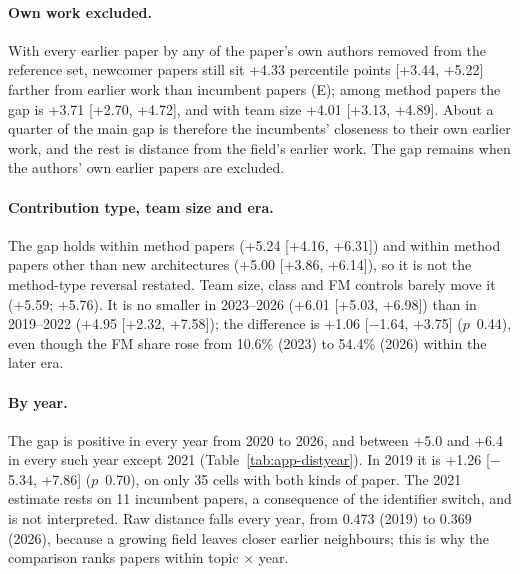 \paragraph{Own work excluded.} With every earlier paper by any of the paper's own authors removed from the reference
set, newcomer papers still sit +4.33 percentile points [+3.44, +5.22] farther from earlier work than incumbent papers
(E); among method papers the gap is +3.71 [+2.70, +4.72], and with team size +4.01 [+3.13, +4.89]. About a quarter of
the main gap is therefore the incumbents' closeness to their own earlier work, and the rest is distance from the
field's earlier work. The gap remains when the authors' own earlier papers are excluded.

\paragraph{Contribution type, team size and era.} The gap holds within method papers (+5.24 [+4.16, +6.31]) and
within method papers other than new architectures (+5.00 [+3.86, +6.14]), so it is not the method-type reversal
restated. Team size, class and FM controls barely move it (+5.59; +5.76). It is no smaller in 2023--2026 (+6.01
[+5.03, +6.98]) than in 2019--2022 (+4.95 [+2.32, +7.58]); the difference is +1.06 [$-$1.64, +3.75] ($p$~0.44), even
though the FM share rose from 10.6\% (2023) to 54.4\% (2026) within the later era.

\paragraph{By year.} The gap is positive in every year from 2020 to 2026, and between +5.0 and +6.4 in every such year
except 2021 (Table~\ref{tab:app-distyear}).
In 2019 it is +1.26 [$-$5.34, +7.86] ($p$~0.70), on only 35 cells with both kinds of paper. The 2021 estimate rests on
11 incumbent papers, a consequence of the identifier switch, and is not interpreted. Raw distance falls every year,
from 0.473 (2019) to 0.369 (2026), because a growing field leaves closer earlier neighbours; this is why the
comparison ranks papers within topic $\times$ year.

